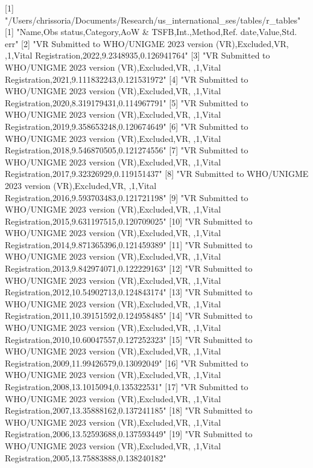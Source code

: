 [1] "/Users/chrissoria/Documents/Research/us_international_ses/tables/r_tables"
  [1] "Name,Obs status,Category,AoW & TSFB,Int.,Method,Ref. date,Value,Std. err"                                                     
  [2] "VR Submitted to WHO/UNIGME 2023 version (VR),Excluded,VR, ,1,Vital Registration,2022,9.2348935,0.126941764"                   
  [3] "VR Submitted to WHO/UNIGME 2023 version (VR),Excluded,VR, ,1,Vital Registration,2021,9.111832243,0.121531972"                 
  [4] "VR Submitted to WHO/UNIGME 2023 version (VR),Excluded,VR, ,1,Vital Registration,2020,8.319179431,0.114967791"                 
  [5] "VR Submitted to WHO/UNIGME 2023 version (VR),Excluded,VR, ,1,Vital Registration,2019,9.358653248,0.120674649"                 
  [6] "VR Submitted to WHO/UNIGME 2023 version (VR),Excluded,VR, ,1,Vital Registration,2018,9.546870505,0.121274556"                 
  [7] "VR Submitted to WHO/UNIGME 2023 version (VR),Excluded,VR, ,1,Vital Registration,2017,9.32326929,0.119151437"                  
  [8] "VR Submitted to WHO/UNIGME 2023 version (VR),Excluded,VR, ,1,Vital Registration,2016,9.593703483,0.121721198"                 
  [9] "VR Submitted to WHO/UNIGME 2023 version (VR),Excluded,VR, ,1,Vital Registration,2015,9.631197515,0.120709025"                 
 [10] "VR Submitted to WHO/UNIGME 2023 version (VR),Excluded,VR, ,1,Vital Registration,2014,9.871365396,0.121459389"                 
 [11] "VR Submitted to WHO/UNIGME 2023 version (VR),Excluded,VR, ,1,Vital Registration,2013,9.842974071,0.122229163"                 
 [12] "VR Submitted to WHO/UNIGME 2023 version (VR),Excluded,VR, ,1,Vital Registration,2012,10.54902713,0.124843174"                 
 [13] "VR Submitted to WHO/UNIGME 2023 version (VR),Excluded,VR, ,1,Vital Registration,2011,10.39151592,0.124958485"                 
 [14] "VR Submitted to WHO/UNIGME 2023 version (VR),Excluded,VR, ,1,Vital Registration,2010,10.60047557,0.127252323"                 
 [15] "VR Submitted to WHO/UNIGME 2023 version (VR),Excluded,VR, ,1,Vital Registration,2009,11.99426579,0.13092049"                  
 [16] "VR Submitted to WHO/UNIGME 2023 version (VR),Excluded,VR, ,1,Vital Registration,2008,13.1015094,0.135322531"                  
 [17] "VR Submitted to WHO/UNIGME 2023 version (VR),Excluded,VR, ,1,Vital Registration,2007,13.35888162,0.137241185"                 
 [18] "VR Submitted to WHO/UNIGME 2023 version (VR),Excluded,VR, ,1,Vital Registration,2006,13.52593688,0.137593449"                 
 [19] "VR Submitted to WHO/UNIGME 2023 version (VR),Excluded,VR, ,1,Vital Registration,2005,13.75883888,0.138240182"                 
